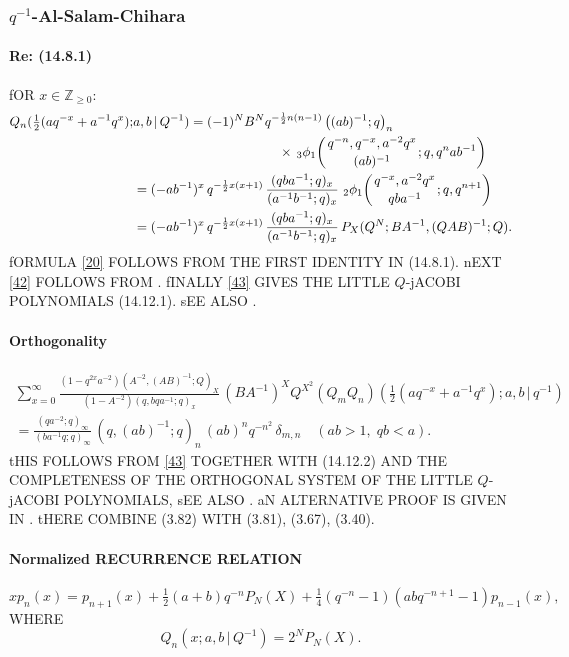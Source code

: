 \documentclass[twoside,11pt]{article}
\newcommand\ZZ{\mathbb{Z}}
\newcommand\de\delta
\newcommand\half{\frac12}
\newcommand\thalf{\tfrac12}
\newcommand\iy\infty
\newcommand\Znonneg{\ZZ_{\ge0}}
\newcommand{\qhyp}[5]{\,\mbox{}_{#1}\phi_{#2}\!\left( 
  \genfrac{}{}{0pt}{}{#3}{#4};#5\right)}
\begin{document}
\subsubsection*{$q^{-1}$-Al-Salam-Chihara} 
% 
\paragraph{Re: (14.8.1)} 
fOR $x\in\Znonneg$: 
% 
\begin{align} 
Q_n(\thalf(aq^{-x}+a^{-1}q^x);&a,b\,|\, Q^{-1})= 
(-1)^N B^N q^{-\half n(n-1)}\left((ab)^{-1};q\right)_n 
\nonumber\\ 
&\qquad\qquad\qquad\qquad\qquad\quad 
\times\qhyp31{q^{-n},q^{-x},a^{-2}q^x}{(ab)^{-1}}{q,q^nab^{-1}} 
\label{20}\\ 
&=(-ab^{-1})^x\,q^{-\half x(x+1)}\,\frac{(qba^{-1};q)_x}{(a^{-1}b^{-1};q)_x}\, 
\qhyp21{q^{-x},a^{-2}q^x}{qba^{-1}}{q,q^{n+1}} 
\label{42}\\ 
&=(-ab^{-1})^x\,q^{-\half x(x+1)}\,\frac{(qba^{-1};q)_x}{(a^{-1}b^{-1};q)_x}\, 
P_X(Q^N;BA^{-1},(QAB)^{-1};Q). 
\label{43} 
\end{align} 
% 
fORMULA \eqref{20} FOLLOWS FROM THE FIRST IDENTITY IN (14.8.1). 
nEXT \eqref{42} FOLLOWS FROM . 
fINALLY \eqref{43} GIVES THE LITTLE $Q$-jACOBI POLYNOMIALS (14.12.1). 
sEE ALSO . 
% 
\paragraph{Orthogonality} 
% 
\begin{multline} 
\sum_{x=0}^\iy 
\frac{(1-q^{2x}a^{-2}) (A^{-2},(AB)^{-1};Q)_X} 
{(1-A^{-2}) (q,bqa^{-1};q)_x}\, 
(BA^{-1})^XQ^{X^2} 
(Q_mQ_n)(\thalf(aq^{-x}+a^{-1}q^x);a,b\,|\, q^{-1})\\ 
=\frac{(qa^{-2};q)_\iy}{(ba^{-1}q;q)_\iy}\, 
(q,(ab)^{-1};q)_n\,(ab)^nq^{-n^2}\,\de_{m,n} 
\quad(ab>1,\;qb<a). 
\label{21} 
\end{multline} 
% 
tHIS FOLLOWS FROM \eqref{43} TOGETHER WITH (14.12.2) AND THE COMPLETENESS OF 
THE ORTHOGONAL SYSTEM OF THE LITTLE $Q$-jACOBI POLYNOMIALS, 
sEE ALSO . aN ALTERNATIVE PROOF IS GIVEN IN 
. tHERE COMBINE (3.82) WITH (3.81), (3.67), (3.40). 
% 
\paragraph{Normalized RECURRENCE RELATION} 
% 
\begin{equation} 
xp_n(x)=p_{n+1}(x)+\thalf(a+b)q^{-n} P_N(X)+ 
\tfrac14(q^{-n}-1)(abq^{-n+1}-1)p_{n-1}(x), 
\label{22} 
\end{equation} 
% 
WHERE 
\[ 
Q_n(x;a,b\,|\, Q^{-1})=2^N P_N(X). 
\] 
% 
\end{document}
